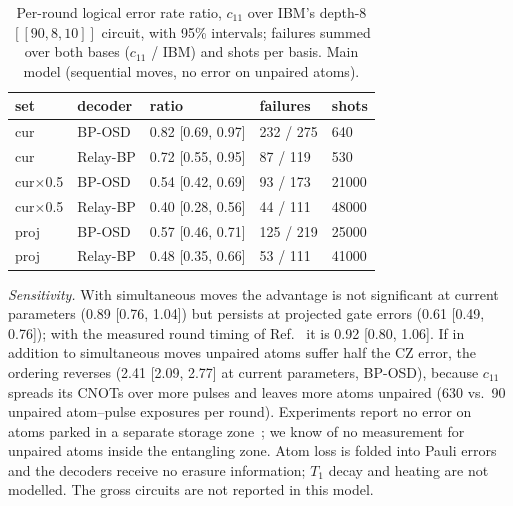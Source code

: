 \documentclass[aps,prl,twocolumn,superscriptaddress,nofootinbib]{revtex4-2}
\newcommand{\code}[1]{[[#1]]}
\begin{document}
\begin{table}[h]
\caption{Per-round logical error rate ratio, $c_{11}$ over IBM's depth-8 $\code{90,8,10}$
circuit, with 95\% intervals; failures summed over both bases ($c_{11}$ / IBM) and shots per
basis. Main model (sequential moves, no error on unpaired atoms).}
\label{tab:naratio}
\begin{ruledtabular}
\begin{tabular}{lllll}
set & decoder & ratio & failures & shots\\
\hline
cur & BP-OSD & 0.82 [0.69, 0.97] & 232 / 275 & 640\\
cur & Relay-BP & 0.72 [0.55, 0.95] & 87 / 119 & 530\\
cur$\times$0.5 & BP-OSD & 0.54 [0.42, 0.69] & 93 / 173 & 21000\\
cur$\times$0.5 & Relay-BP & 0.40 [0.28, 0.56] & 44 / 111 & 48000\\
proj & BP-OSD & 0.57 [0.46, 0.71] & 125 / 219 & 25000\\
proj & Relay-BP & 0.48 [0.35, 0.66] & 53 / 111 & 41000\\
\end{tabular}
\end{ruledtabular}
\end{table}

\emph{Sensitivity.} With simultaneous moves the advantage is not significant at current
parameters (0.89 [0.76, 1.04]) but persists at projected gate errors (0.61 [0.49, 0.76]);
with the measured round timing of Ref.~\cite{Bluvstein2025} it is 0.92 [0.80, 1.06]. If in
addition to simultaneous moves unpaired atoms suffer half the CZ error, the ordering
reverses (2.41 [2.09, 2.77] at current parameters, BP-OSD), because $c_{11}$ spreads its
CNOTs over more pulses and leaves more atoms unpaired (630 vs.\ 90 unpaired atom--pulse
exposures per round). Experiments report no error on atoms parked in a separate storage
zone~\cite{Bluvstein2024,Bluvstein2025}; we know of no measurement for unpaired atoms inside
the entangling zone. Atom loss is folded into Pauli errors and the decoders receive no
erasure information; $T_1$ decay and heating are not modelled. The gross circuits are not
reported in this model.

\end{document}
